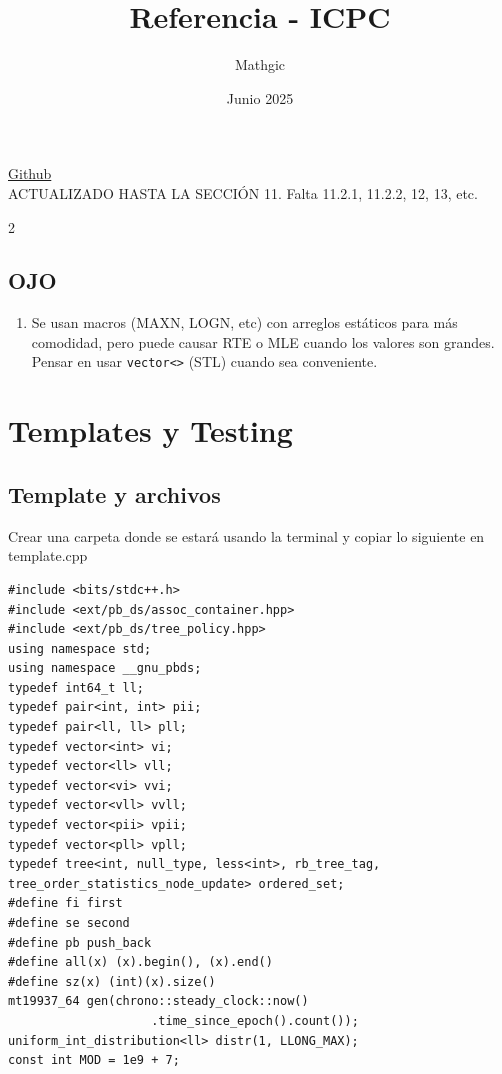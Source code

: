 \documentclass[10pt,spanish,mexico]{article}
\title{Referencia - ICPC}
\author{Mathgic}
\date{Junio 2025}
\numberwithin{equation}{section}
\begin{document}
\maketitle

\begin{center}
    \href{https://github.com/SJMA11723/Data-structures-and-algorithms}{Github}
    \\ACTUALIZADO HASTA LA SECCIÓN 11. Falta 11.2.1, 11.2.2, 12, 13, etc.
\end{center}

\newpage
\tableofcontents

\newpage
{}

\begin{multicols}{2}

\subsection{OJO}
\begin{enumerate}[1.]
    \item Se usan macros (MAXN, LOGN, etc) con arreglos estáticos para más comodidad, pero puede causar RTE o MLE cuando los valores son grandes. Pensar en usar \texttt{vector<>} (STL) cuando sea conveniente.
\end{enumerate}

\hrulefill
\section{Templates y Testing}
\subsection{Template y archivos}
Crear una carpeta donde se estará usando la terminal y copiar lo siguiente en template.cpp
 \begin{verbatim}
#include <bits/stdc++.h>
#include <ext/pb_ds/assoc_container.hpp>
#include <ext/pb_ds/tree_policy.hpp>
using namespace std;
using namespace __gnu_pbds;
typedef int64_t ll;
typedef pair<int, int> pii;
typedef pair<ll, ll> pll;
typedef vector<int> vi;
typedef vector<ll> vll;
typedef vector<vi> vvi;
typedef vector<vll> vvll;
typedef vector<pii> vpii;
typedef vector<pll> vpll;
typedef tree<int, null_type, less<int>, rb_tree_tag, tree_order_statistics_node_update> ordered_set;
#define fi first
#define se second
#define pb push_back
#define all(x) (x).begin(), (x).end()
#define sz(x) (int)(x).size()
mt19937_64 gen(chrono::steady_clock::now()
                    .time_since_epoch().count());
uniform_int_distribution<ll> distr(1, LLONG_MAX);
const int MOD = 1e9 + 7;
 \end{verbatim}


\end{multicols}
\end{document}
